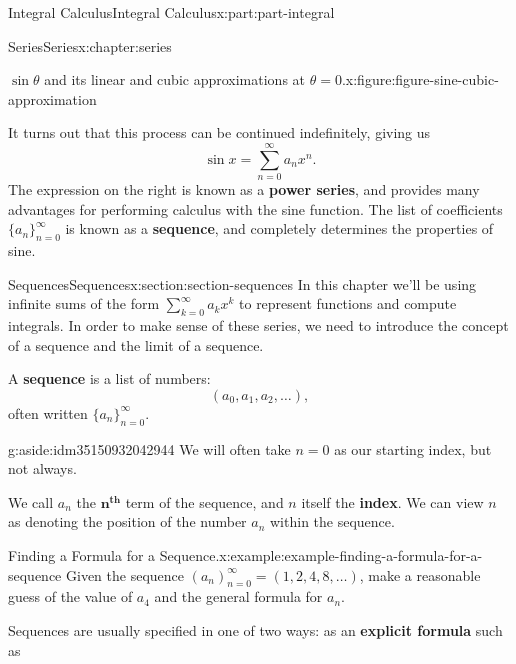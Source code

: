 \documentclass[twoside,10pt,]{tufte-book}
\newcommand{\terminology}[1]{\textbf{#1}}
\numberwithin{equation}{part}
\begin{document}
\begin{partptx}{Integral Calculus}{}{Integral Calculus}{}{}{x:part:part-integral}
\begin{chapterptx}{Series}{}{Series}{}{}{x:chapter:series}
\begin{introduction}{}
\begin{figureptx}{\(\sin\theta\) and its linear and cubic approximations at \(\theta=0\).}{x:figure:figure-sine-cubic-approximation}{}
\begin{image}{0}{1}{0}
{
}%
\end{image}%
\tcblower
\end{figureptx}%
It turns out that this process can be continued indefinitely, giving us%
\begin{equation*}
\sin x = \sum_{n=0}^{\infty}a_{n}x^{n}.
\end{equation*}
The expression on the right is known as a \terminology{power series}, and provides many advantages for performing calculus with the sine function. The list of coefficients \(\{a_{n}\}_{n=0}^{\infty}\) is known as a \terminology{sequence}, and completely determines the properties of sine.%
\end{introduction}%
%
%
\typeout{************************************************}
\typeout{************************************************}
%
\begin{sectionptx}{Sequences}{}{Sequences}{}{}{x:section:section-sequences}
In this chapter we'll be using infinite sums of the form \(\sum_{k=0}^{\infty}a_k x^k\) to represent functions and compute integrals. In order to make sense of these series, we need to introduce the concept of a sequence and the limit of a sequence.%
\par
A \terminology{sequence} is a list of numbers:%
\begin{equation*}
(a_{0}, a_{1}, a_{2}, \ldots),
\end{equation*}
often written \(\{a_{n}\}_{n=0}^{\infty}\). \begin{aside}{}{g:aside:idm35150932042944}%
We will often take \(n = 0\) as our starting index, but not always.%
\end{aside}
 We call \(a_{n}\) the \(\mathbf{n}^{\textbf{th}}\) term of the sequence, and \(n\) itself the \terminology{index}. We can view \(n\) as denoting the position of the number \(a_n\) within the sequence.%
\begin{example}{Finding a Formula for a Sequence.}{x:example:example-finding-a-formula-for-a-sequence}%
Given the sequence \((a_n)_{n=0}^{\infty} = (1, 2, 4, 8, \ldots)\), make a reasonable guess of the value of \(a_4\) and the general formula for \(a_n\).%
\end{example}
Sequences are usually specified in one of two ways: as an \terminology{explicit formula} such as%
\begin{equation*}

\end{equation*}
\end{sectionptx}
\end{chapterptx}
\end{partptx}
\end{document}
